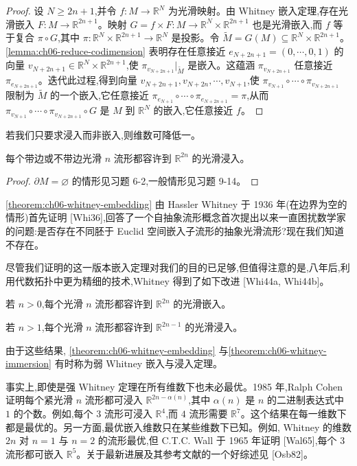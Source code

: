 \documentclass[../../main.tex]{subfiles}
\begin{document}
\begin{proof}
设 $N\geqslant 2n+1$,并令 $f:M\to\mathbb{R}^N$ 为光滑映射。由 Whitney 嵌入定理,存在光滑嵌入 $F:M\to\mathbb{R}^{2n+1}$。映射 $G=f\times F:M\to\mathbb{R}^N\times\mathbb{R}^{2n+1}$ 也是光滑嵌入,而 $f$ 等于复合 $\pi\circ G$,其中 $\pi:\mathbb{R}^N\times\mathbb{R}^{2n+1}\to\mathbb{R}^N$ 是投影。令 $\widetilde{M}=G(M)\subseteq\mathbb{R}^N\times\mathbb{R}^{2n+1}$。\cref{lemma:ch06-reduce-codimension} 表明存在任意接近 $e_{N+2n+1}=(0,\cdots ,0,1)$ 的向量 $v_{N+2n+1}\in\mathbb{R}^N\times\mathbb{R}^{2n+1}$,使 $\pi_{v_{N+2n+1}}|_{\widetilde{M}}$ 是嵌入。这蕴涵 $\pi_{v_{N+2n+1}}$ 任意接近 $\pi_{e_{N+2n+1}}$。迭代此过程,得到向量 $v_{N+2n+1},v_{N+2n},\cdots ,v_{N+1}$,使 $\pi_{v_{N+1}}\circ\cdots\circ\pi_{v_{N+2n+1}}$ 限制为 $\widetilde{M}$ 的一个嵌入,它任意接近 $\pi_{e_{N+1}}\circ\cdots\circ\pi_{e_{N+2n+1}}=\pi$,从而 $\pi_{v_{N+1}}\circ\cdots\circ\pi_{v_{N+2n+1}}\circ G$ 是 $M$ 到 $\mathbb{R}^N$ 的嵌入,它任意接近 $f$。
\end{proof}

若我们只要求浸入而非嵌入,则维数可降低一。

\begin{theorem}\label{theorem:ch06-whitney-immersion}
每个带边或不带边光滑 $n$ 流形都容许到 $\mathbb{R}^{2n}$ 的光滑浸入。
\end{theorem}

\begin{proof}
$\partial M=\varnothing$ 的情形见习题 6-2,一般情形见习题 9-14。
\end{proof}

\cref{theorem:ch06-whitney-embedding} 由 Hassler Whitney 于 1936 年(在边界为空的情形)首先证明 [Whi36],回答了一个自抽象流形概念首次提出以来一直困扰数学家的问题:是否存在不同胚于 Euclid 空间嵌入子流形的抽象光滑流形?现在我们知道不存在。

尽管我们证明的这一版本嵌入定理对我们的目的已足够,但值得注意的是,八年后,利用代数拓扑中更为精细的技术,Whitney 得到了如下改进 [Whi44a, Whi44b]。

\begin{theorem}\label{theorem:ch06-strong-embedding}
若 $n>0$,每个光滑 $n$ 流形都容许到 $\mathbb{R}^{2n}$ 的光滑嵌入。
\end{theorem}

\begin{theorem}\label{theorem:ch06-strong-immersion}
若 $n>1$,每个光滑 $n$ 流形都容许到 $\mathbb{R}^{2n-1}$ 的光滑浸入。
\end{theorem}

由于这些结果, \cref{theorem:ch06-whitney-embedding} 与\cref{theorem:ch06-whitney-immersion} 有时称为弱 Whitney 嵌入与浸入定理。

事实上,即使是强 Whitney 定理在所有维数下也未必最优。1985 年,Ralph Cohen 证明每个紧光滑 $n$ 流形都可浸入 $\mathbb{R}^{2n-\alpha(n)}$,其中 $\alpha(n)$ 是 $n$ 的二进制表达式中 $1$ 的个数。例如,每个 $3$ 流形可浸入 $\mathbb{R}^4$,而 $4$ 流形需要 $\mathbb{R}^7$。这个结果在每一维数下都是最优的。另一方面,最优嵌入维数只在某些维数下已知。例如, Whitney 的维数 $2n$ 对 $n=1$ 与 $n=2$ 的流形最优,但 C.T.C. Wall 于 1965 年证明 [Wal65],每个 $3$ 流形都可嵌入 $\mathbb{R}^5$。关于最新进展及其参考文献的一个好综述见 [Osb82]。
\end{document}
